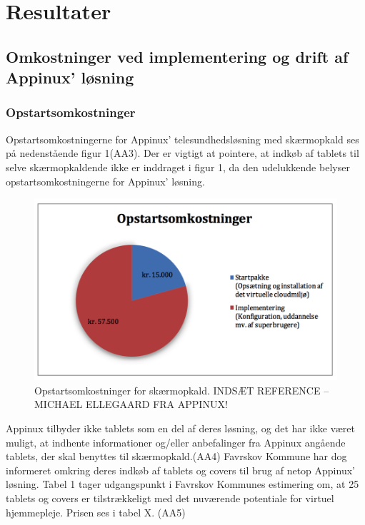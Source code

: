 \section{Resultater}
\subsection{Omkostninger ved implementering og drift af Appinux' løsning}
\subsubsection{Opstartsomkostninger}
Opstartsomkostningerne for Appinux’ telesundhedsløsning med skærmopkald ses på nedenstående figur 1(AA3). Der er vigtigt at pointere, at indkøb af tablets til selve skærmopkaldende ikke er inddraget i figur 1, da den udelukkende belyser opstartsomkostningerne for Appinux’ løsning.

\begin{figure}[H]
	\centering
	\includegraphics[width=1\textwidth]{Figurer/Snip20160504_26}
	\caption{Opstartsomkostninger for skærmopkald. INDSÆT REFERENCE – MICHAEL ELLEGAARD FRA APPINUX!}
\end{figure}

Appinux tilbyder ikke tablets som en del af deres løsning, og det har ikke været muligt, at indhente informationer og/eller anbefalinger fra Appinux angående tablets, der skal benyttes til skærmopkald.(AA4)
Favrskov Kommune har dog informeret omkring deres indkøb af tablets og covers til brug af netop Appinux’ løsning. 
Tabel 1 tager udgangspunkt i Favrskov Kommunes estimering om, at 25 tablets og covers er tilstrækkeligt med det nuværende potentiale for virtuel hjemmepleje. Prisen ses i tabel X. (AA5) 

